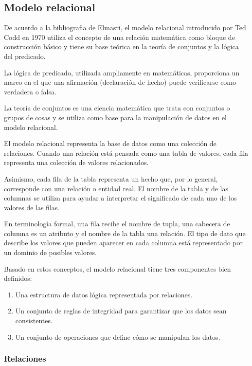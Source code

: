 \subsection{Modelo relacional}

De acuerdo a la bibliografia de Elmasri\cite{ramez_elmasri_fundamentos_nodate}, el modelo relacional introducido por Ted Codd en 1970\cite{codd_relational_nodate} utiliza el concepto de una relación matemática como bloque de construcción básico y tiene su base teórica en la teoría de conjuntos y la lógica del predicado.

La lógica de predicado, utilizada ampliamente en matemáticas, proporciona un marco en el que una afirmación (declaración de hecho) puede verificarse como verdadera o falsa.


La teoría de conjuntos es una ciencia matemática que trata con conjuntos o grupos de cosas y se utiliza como base para la manipulación de datos en el modelo relacional.


El modelo relacional representa la base de datos como una colección de relaciones. Cuando una relación está pensada como una tabla de valores, cada fila representa una colección de valores relacionados.


Asimismo, cada fila de la tabla representa un hecho que, por lo general, corresponde con una relación o entidad real. El nombre de la tabla y de las columnas se utiliza para ayudar a interpretar el significado de cada uno de los valores de las filas.


En terminología formal, una fila recibe el nombre de tupla, una cabecera de columna es un atributo y el nombre de la tabla una relación. El tipo de dato que describe los valores que pueden aparecer en cada columna está representado por un dominio de posibles valores. 


Basado en estos conceptos, el modelo relacional tiene tres componentes bien definidos:
\begin{enumerate}
    \item Una estructura de datos lógica representada por relaciones.
    \item Un conjunto de reglas de integridad para garantizar que los datos sean consistentes.
    \item Un conjunto de operaciones que define cómo se manipulan los datos.
\end{enumerate}
\subsubsection{Relaciones}
